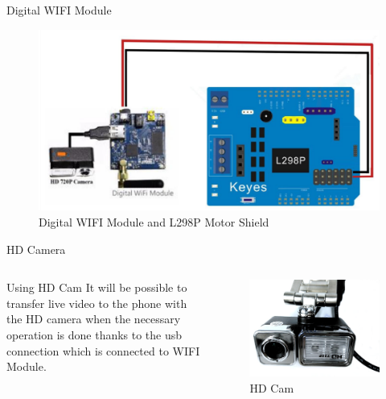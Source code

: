 \documentclass[xcolor=table, 9pt]{beamer}
\begin{document}


\begin{frame}{Digital WIFI Module}
\begin{figure}
\includegraphics[width=1\linewidth]{connectwifi.png}
\caption{Digital WIFI Module and L298P Motor Shield}
\end{figure}
\end{frame}



\begin{frame}{HD Camera}
\begin{columns}[c] 
\begin{block}{Using HD Cam}
It will be possible to transfer live video to the phone with the HD camera when the necessary operation is done thanks to the usb connection which is connected to WIFI Module.
\end{block}
\begin{figure}
\includegraphics[width=1\linewidth]{camtemiz.png}
\caption{HD Cam}
\end{figure}
\end{columns}
\end{frame}
\end{document}

